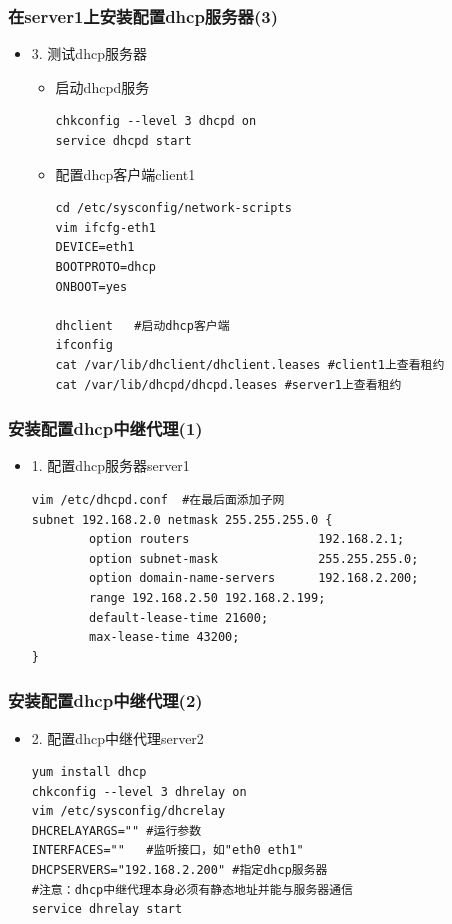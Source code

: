 \documentclass[xcolor=svgnames,presentation]{beamer}
\begin{document}
\begin{frame}[fragile]
\frametitle{在server1上安装配置dhcp服务器(3)}
\label{sec-2-3}
\begin{itemize}

\item 3. 测试dhcp服务器
\label{sec-2-3-1}%
\begin{itemize}

\item 启动dhcpd服务\\
\label{sec-2-3-1-1}%
\begin{verbatim}
chkconfig --level 3 dhcpd on
service dhcpd start
\end{verbatim}

\item 配置dhcp客户端client1\\
\label{sec-2-3-1-2}%
\begin{verbatim}
cd /etc/sysconfig/network-scripts
vim ifcfg-eth1
DEVICE=eth1
BOOTPROTO=dhcp
ONBOOT=yes

dhclient   #启动dhcp客户端
ifconfig
cat /var/lib/dhclient/dhclient.leases #client1上查看租约
cat /var/lib/dhcpd/dhcpd.leases #server1上查看租约
\end{verbatim}
\end{itemize} %
\end{itemize} %
\end{frame}
\begin{frame}[fragile]
\frametitle{安装配置dhcp中继代理(1)}
\label{sec-2-4}
\begin{itemize}

\item 1. 配置dhcp服务器server1\\
\label{sec-2-4-1}%
\begin{verbatim}
vim /etc/dhcpd.conf  #在最后面添加子网
subnet 192.168.2.0 netmask 255.255.255.0 {
        option routers                  192.168.2.1;
        option subnet-mask              255.255.255.0;
        option domain-name-servers      192.168.2.200;
        range 192.168.2.50 192.168.2.199;
        default-lease-time 21600;
        max-lease-time 43200;
}
\end{verbatim}
\end{itemize} %
\end{frame}
\begin{frame}[fragile]
\frametitle{安装配置dhcp中继代理(2)}
\label{sec-2-5}
\begin{itemize}

\item 2. 配置dhcp中继代理server2\\
\label{sec-2-5-1}%
\begin{verbatim}
yum install dhcp
chkconfig --level 3 dhrelay on
vim /etc/sysconfig/dhcrelay
DHCRELAYARGS="" #运行参数
INTERFACES=""   #监听接口，如"eth0 eth1"
DHCPSERVERS="192.168.2.200" #指定dhcp服务器
#注意：dhcp中继代理本身必须有静态地址并能与服务器通信
service dhrelay start
\end{verbatim}
\end{itemize} %
\end{frame}
\end{document}
